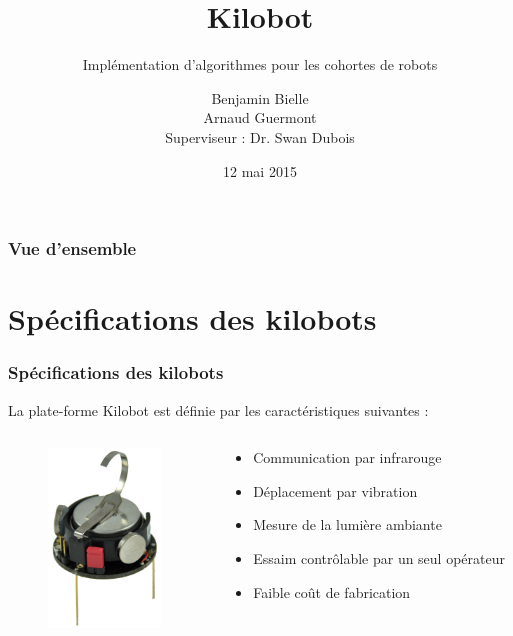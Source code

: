 \documentclass[xcolor=table]{beamer}
\title[PSAR 12 : Kilobot]{\Huge{Kilobot}}
\subtitle{Impl\'ementation d'algorithmes pour les cohortes de robots}
\author[Benjamin Bielle, Arnaud Guermont]{Benjamin Bielle\\Arnaud Guermont\\Superviseur : Dr. Swan Dubois }
\institute{Universit\'e Pierre et Marie Curie}
\date{12 mai 2015}
\begin{document}
\begin{frame}
  \titlepage
\end{frame}

\begin{frame}
  \frametitle{Vue d'ensemble} %
  \tableofcontents %
\end{frame}

\section{Sp\'ecifications des kilobots}
\begin{frame}
  \frametitle{Sp\'ecifications des kilobots}
  La plate-forme Kilobot est définie par les caractéristiques suivantes : 
  \begin{columns}[T] %
    \begin{column}{.48\textwidth}
      \begin{figure}[!h]
        \includegraphics[width=3cm]{kilobotSpecs.jpg}
      \end{figure}
    \end{column}%
    \hfill%
    \begin{column}{.48\textwidth}
      \begin{itemize}
        \item Communication par infrarouge
        \item D\'eplacement par vibration
        \item Mesure de la lumi\`ere ambiante
        \item Essaim contr\^olable par un seul op\'erateur
        \item Faible co\^ut de fabrication
      \end{itemize}
    \end{column}%
  \end{columns}
\end{frame}
\end{document}
